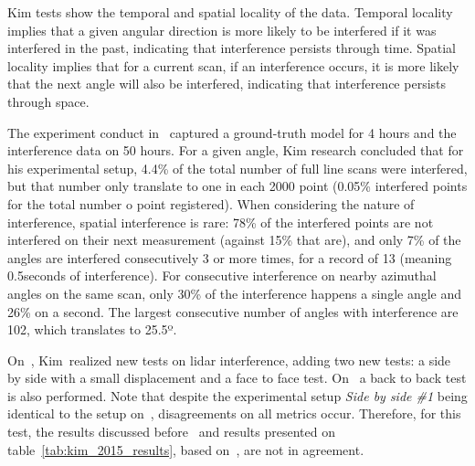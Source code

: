 Kim \etal tests show the temporal and spatial locality of the data. Temporal locality implies that a given angular direction is more likely to be interfered if it was interfered in the past, indicating that interference persists through time. Spatial locality implies that for a current scan, if an interference occurs, it is more likely that the next angle will also be interfered, indicating that interference persists through space. 



The experiment conduct in~\cite{Kim2015a} captured a ground-truth model for 4 hours and the interference data on 50 hours. For a given angle, Kim research concluded that for his experimental setup, 4.4\% of the total number of full line scans were interfered, but that number only translate to one in each 2000 point (0.05\% interfered points for the total number o point registered). When considering the nature of interference, spatial interference is rare: 78\% of the interfered points are not interfered on their next measurement (against 15\% that are), and only 7\% of the angles are interfered consecutively 3 or more times, for a record of 13 (meaning 0.5seconds of interference). For consecutive interference on nearby azimuthal angles on the same scan, only 30\% of the interference happens a single angle and 26\% on a second. The largest consecutive number of angles with interference are 102, which translates to 25.5º.


On~\cite{Kim2015b}, Kim~\etal realized new tests on \ac{lidar} interference, adding two new tests: a side by side with a small displacement and a face to face test. On~\cite{Kim2015c} a back to back test is also performed. Note that despite the experimental setup \textit{Side by side \#1} being identical to the setup on~\cite{Kim2015a}, disagreements on all metrics occur. Therefore, for this test, the results discussed before~\cite{Kim2015a} and results presented on table~\ref{tab:kim_2015_results}, based on~\cite{Kim2015b, Kim2015c}, are not in agreement.

